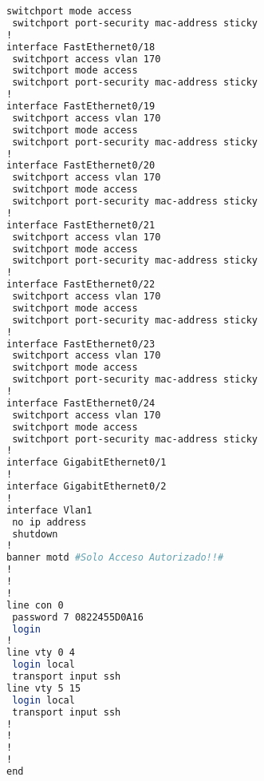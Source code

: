 \begin{lstlisting}[language=Bash, caption={Configuración Completa Switch DMZ Invitados}]
 switchport mode access
 switchport port-security mac-address sticky 
!
interface FastEthernet0/18
 switchport access vlan 170
 switchport mode access
 switchport port-security mac-address sticky 
!
interface FastEthernet0/19
 switchport access vlan 170
 switchport mode access
 switchport port-security mac-address sticky 
!
interface FastEthernet0/20
 switchport access vlan 170
 switchport mode access
 switchport port-security mac-address sticky 
!
interface FastEthernet0/21
 switchport access vlan 170
 switchport mode access
 switchport port-security mac-address sticky 
!
interface FastEthernet0/22
 switchport access vlan 170
 switchport mode access
 switchport port-security mac-address sticky 
!
interface FastEthernet0/23
 switchport access vlan 170
 switchport mode access
 switchport port-security mac-address sticky 
!
interface FastEthernet0/24
 switchport access vlan 170
 switchport mode access
 switchport port-security mac-address sticky 
!
interface GigabitEthernet0/1
!
interface GigabitEthernet0/2
!
interface Vlan1
 no ip address
 shutdown
!
banner motd #Solo Acceso Autorizado!!#
!
!
!
line con 0
 password 7 0822455D0A16
 login
!
line vty 0 4
 login local
 transport input ssh
line vty 5 15
 login local
 transport input ssh
!
!
!
!
end
\end{lstlisting}

